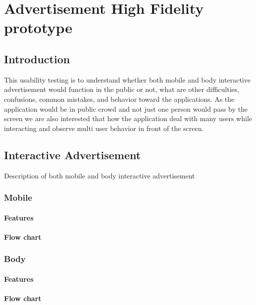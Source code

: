 \chapter{Advertisement High Fidelity prototype} %

\label{Chapter6} %

\section{Introduction}

This usability testing is to understand whether both mobile and body interactive advertisement would function in the public or not, what are other difficulties, confusions, common mistakes, and behavior toward the applications. As the application would be in public crowd and not just one person would pass by the screen we are also interested that how the application deal with many users while interacting and observe multi user behavior in front of the screen.

\section {Interactive Advertisement}
Description of both mobile and body interactive advertisement

\subsection{Mobile}
\subsubsection{Features}

\subsubsection{Flow chart}


\subsection{Body}
\subsubsection{Features}

\subsubsection{Flow chart}



